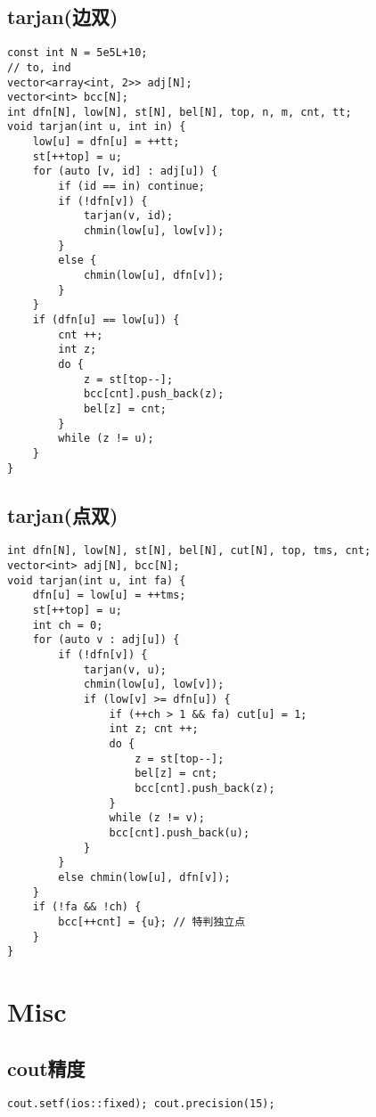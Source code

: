 \documentclass[a4paper,landscape,twocolumn]{ctexart}
\begin{document}
\subsection{tarjan(边双)}

\begin{lstlisting}
const int N = 5e5L+10;
// to, ind
vector<array<int, 2>> adj[N];
vector<int> bcc[N];
int dfn[N], low[N], st[N], bel[N], top, n, m, cnt, tt;
void tarjan(int u, int in) {
	low[u] = dfn[u] = ++tt;
	st[++top] = u;
	for (auto [v, id] : adj[u]) {
		if (id == in) continue;
		if (!dfn[v]) {
			tarjan(v, id);
			chmin(low[u], low[v]);
		}
		else {
			chmin(low[u], dfn[v]);
		}
	}
	if (dfn[u] == low[u]) {
		cnt ++;
		int z;
		do {
			z = st[top--];
			bcc[cnt].push_back(z);
			bel[z] = cnt;
		}
		while (z != u);
	}
}
\end{lstlisting}

\subsection{tarjan(点双)}

\begin{lstlisting}
int dfn[N], low[N], st[N], bel[N], cut[N], top, tms, cnt;
vector<int> adj[N], bcc[N];
void tarjan(int u, int fa) {
	dfn[u] = low[u] = ++tms;
	st[++top] = u;
	int ch = 0;
	for (auto v : adj[u]) {
		if (!dfn[v]) {
			tarjan(v, u);
			chmin(low[u], low[v]);
			if (low[v] >= dfn[u]) {
				if (++ch > 1 && fa) cut[u] = 1;
				int z; cnt ++;
				do {
					z = st[top--];
					bel[z] = cnt;
					bcc[cnt].push_back(z);
				}
				while (z != v);
				bcc[cnt].push_back(u);
			}
		}
		else chmin(low[u], dfn[v]);
	}
	if (!fa && !ch) {
		bcc[++cnt] = {u}; // 特判独立点
	}
}
\end{lstlisting}

\section{Misc}

\subsection{cout精度}

\begin{lstlisting}
cout.setf(ios::fixed); cout.precision(15);
\end{lstlisting}

%
\end{document}
